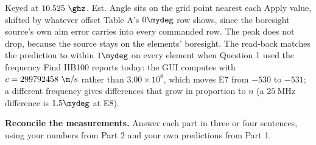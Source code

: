 \documentclass{exam}
\begin{document}
\begin{questions}
\begin{solution}
Keyed at $10.525\ \ghz$. Est. Angle sits on the grid point nearest each Apply
value, shifted by whatever offset Table A's $0\mydeg$ row shows, since the
boresight source's own aim error carries into every commanded row. The peak does
not drop, because the source stays on the elements' boresight. The read-back
matches the prediction to within $1\mydeg$ on every element when Question 1 used
the frequency Find HB100 reports today: the GUI computes with
$c = 299792458\ \m/\text{s}$ rather than $3.00\times 10^8$, which moves E7 from
$-530$ to $-531$; a different frequency gives differences that grow in proportion
to $n$ (a $25\ \text{MHz}$ difference is $1.5\mydeg$ at E8).
\end{solution}

\newpage
{}

\question \textbf{Reconcile the measurements.} Answer each part in three or four
sentences, using your numbers from Part 2 and your own predictions from
Part 1.

\end{questions}
\end{document}
